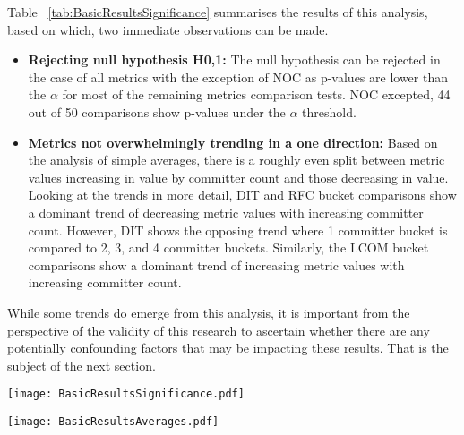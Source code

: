 Table ~\ref{tab:BasicResultsSignificance} summarises the results of this analysis, based on which, two immediate observations can be made.

\begin{itemize}
\item  \textbf{Rejecting null hypothesis H0,1:} The null hypothesis can be rejected in the case of all metrics with the exception of NOC as p-values are lower than the  $\alpha$ for most of the remaining metrics comparison tests. NOC excepted, 44 out of 50 comparisons show p-values under the $\alpha$ threshold. 
\item  \textbf{Metrics not overwhelmingly trending in a one direction:} Based on the analysis of simple averages, there is a roughly even split between metric values increasing in value by committer count and those decreasing in value. Looking at the trends in more detail, DIT and RFC bucket comparisons show a dominant trend of decreasing metric values with increasing committer count. However, DIT shows the opposing trend where 1 committer bucket is compared to 2, 3, and 4 committer buckets. Similarly, the LCOM bucket comparisons show a dominant trend of increasing metric values with increasing committer count.
\end{itemize}

While some trends do emerge from this analysis, it is important from the perspective of the validity of this research to ascertain whether there are any potentially confounding factors that may be impacting these results. That is the subject of the next section.

\begin{table}
\centering 
{}
\begin{tabular}
 \centering 
 \texttt{[image: BasicResultsSignificance.pdf]}
 \label{tab:BasicResultsSignificance}
\end{tabular}
\end{table}

\begin{table}
\centering 
{}
\begin{tabular}
 \centering 
 \texttt{[image: BasicResultsAverages.pdf]}
 \label{tab:BasicResultsAverages}
\end{tabular}
\end{table}

